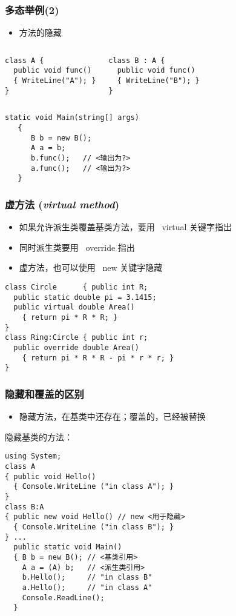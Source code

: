 \begin{frame}[fragile]
\frametitle{多态举例(2)}
\begin{itemize}
\item 方法的隐藏
\end{itemize}
\begin{columns}
\begin{lstlisting}
class A {
  public void func()
  { WriteLine("A"); }
}
\end{lstlisting}
\begin{lstlisting}
class B : A {
  public void func()
  { WriteLine("B"); }
}
\end{lstlisting}
\end{columns}
\begin{lstlisting}[escapeinside=<>]
   static void Main(string[] args)
   {
      B b = new B();
      A a = b;
      b.func();   // <输出为?>
      a.func();   // <输出为?>
   }
\end{lstlisting}
\end{frame}


\begin{frame}[fragile]
\frametitle{虚方法 (\textit{virtual method})}
\begin{itemize}
\item 如果允许派生类{\redwarn 覆盖}基类方法，要用 ~virtual 关键字指出
\item 同时派生类要用 ~override 指出
\item 虚方法，也可以使用 ~new 关键字隐藏
\end{itemize}
\begin{lstlisting}
class Circle      { public int R;
  public static double pi = 3.1415;
  public virtual double Area()
    { return pi * R * R; }
}
class Ring:Circle { public int r;
  public override double Area()
    { return pi * R * R - pi * r * r; }
}
\end{lstlisting}
\end{frame}

\begin{frame}[fragile]
\frametitle{隐藏和覆盖的区别}
\begin{itemize}
\item 隐藏方法，在基类中还存在；覆盖的，已经被替换
\end{itemize}
隐藏基类的方法：
\begin{lstlisting}[escapeinside=<>]
using System;
class A
{ public void Hello()
  { Console.WriteLine ("in class A"); }
}
class B:A
{ public new void Hello() // new <用于隐藏>
  { Console.WriteLine ("in class B"); }
} ...
  public static void Main()
  { B b = new B(); // <基类引用>
    A a = (A) b;   // <派生类引用>
    b.Hello();     // "in class B"
    a.Hello();     // "in class A"
    Console.ReadLine();
  }

\end{lstlisting}
\end{frame}

